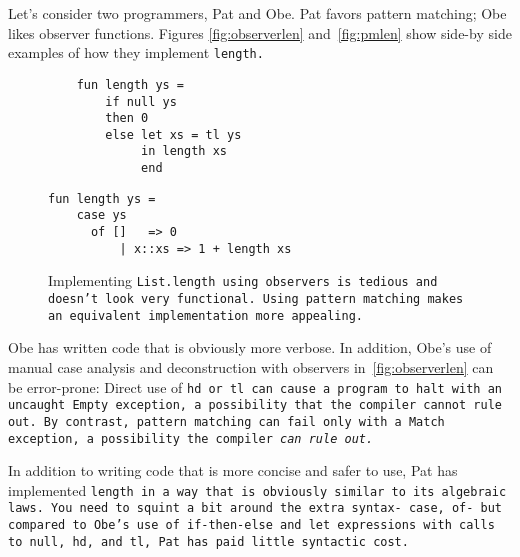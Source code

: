 \documentclass[manuscript,screen,review, 12pt]{acmart}
\begin{document}
    Let's consider two programmers, Pat and Obe. Pat favors pattern matching;
    Obe likes observer functions. Figures \ref{fig:observerlen}
    and~\ref{fig:pmlen} show side-by side examples of how they implement
    \tt{length}. 

    \begin{figure}[h]
        \centering
      \begin{minipage}[t]{0.4\textwidth}
        \begin{verbatim}
    fun length ys =
        if null ys 
        then 0 
        else let xs = tl ys 
             in length xs 
             end 
            \end{verbatim}
            \label{fig:observerlen} 
      \end{minipage}
      \quad
      \begin{minipage}[t]{0.4\textwidth}
        \begin{verbatim}
fun length ys =
    case ys 
      of []   => 0
          | x::xs => 1 + length xs
                \end{verbatim}
       \vspace{2.2em}
       \label{fig:pmlen}
      \end{minipage}
      \caption{Implementing \tt{List.length} using observers is tedious and doesn't
      look very functional. Using pattern matching makes an equivalent
      implementation more appealing.}
      \label{fig:len}
    \end{figure}
    
    Obe has written code that is obviously more verbose. In addition, Obe's use
    of manual case analysis and deconstruction with observers
    in~\ref{fig:observerlen} can be error-prone: Direct use of \tt{hd} or
    \tt{tl} can cause a program to halt with an uncaught \tt{Empty} exception, a
    possibility that the compiler cannot rule out. By contrast, pattern matching
    can fail only with a \tt{Match} exception, a possibility the compiler
    \it{can} rule out. 
    
    In addition to writing code that is more concise and safer to use, Pat has
    implemented \tt{length} in a way that is obviously similar to its algebraic
    laws. You need to squint a bit around the extra syntax- \tt{case}, \tt{of}-
    but compared to Obe's use of \tt{if-then-else} and \tt{let} expressions with
    calls to \tt{null}, \tt{hd}, and \tt{tl}, Pat has paid little syntactic
    cost. 
\end{document}
